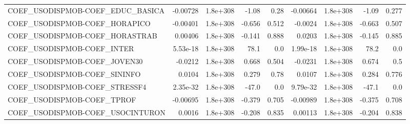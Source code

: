 \begin{tabular}{lrrrrrrrr}
COEF\_USODISPMOB-COEF\_EDUC\_BASICA  &    -0.00728 &     1.8e+308 &     -1.08 &     0.28 &   -0.00664 &    1.8e+308 &        -1.09 &         0.277 \\
COEF\_USODISPMOB-COEF\_HORAPICO     &    -0.00401 &     1.8e+308 &    -0.656 &    0.512 &    -0.0024 &    1.8e+308 &       -0.663 &         0.507 \\
COEF\_USODISPMOB-COEF\_HORASTRAB    &     0.00406 &     1.8e+308 &    -0.141 &    0.888 &     0.0203 &    1.8e+308 &       -0.145 &         0.885 \\
COEF\_USODISPMOB-COEF\_INTER        &    5.53e-18 &     1.8e+308 &      78.1 &      0.0 &   1.99e-18 &    1.8e+308 &         78.2 &           0.0 \\
COEF\_USODISPMOB-COEF\_JOVEN30      &     -0.0212 &     1.8e+308 &     0.668 &    0.504 &    -0.0231 &    1.8e+308 &        0.674 &           0.5 \\
COEF\_USODISPMOB-COEF\_SININFO      &      0.0104 &     1.8e+308 &     0.279 &     0.78 &     0.0107 &    1.8e+308 &        0.284 &         0.776 \\
COEF\_USODISPMOB-COEF\_STRESSF4     &    2.35e-32 &     1.8e+308 &     -47.0 &      0.0 &   9.79e-32 &    1.8e+308 &        -47.1 &           0.0 \\
COEF\_USODISPMOB-COEF\_TPROF        &    -0.00695 &     1.8e+308 &    -0.379 &    0.705 &   -0.00989 &    1.8e+308 &       -0.375 &         0.708 \\
COEF\_USODISPMOB-COEF\_USOCINTURON  &      0.0016 &     1.8e+308 &    -0.208 &    0.835 &    0.00113 &    1.8e+308 &       -0.204 &         0.838 \\
\bottomrule
\end{tabular}
